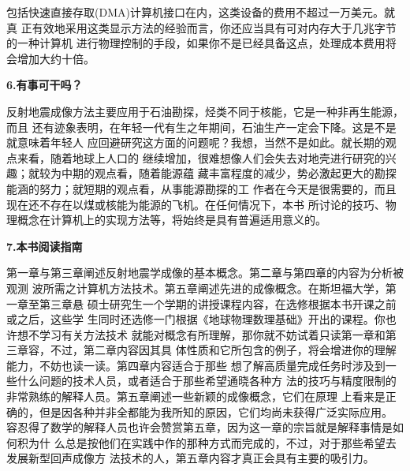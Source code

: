 包括快速直接存取(DMA)计算机接口在内，这类设备的费用不超过一万美元。就真
正有效地采用这类显示方法的经验而言，你还应当具有可对内存大于几兆字节的一种计算机
进行物理控制的手段，如果你不是已经具备这点，处理成本费用将会增加大约十倍。


\textbf{6.有事可干吗？}


反射地震成像方法主要应用于石油勘探，烃类不同于核能，它是一种非再生能源，而且
还有迹象表明，在年轻一代有生之年期间，石油生产一定会下降。这是不是就意味着年轻人
应回避研究这方面的问题呢？我想，当然不是如此。就长期的观点来看，随着地球上人口的
继续增加，很难想像人们会失去对地壳进行研究的兴趣；就较为中期的观点看，随着能源蕴
藏丰富程度的减少，势必激起更大的勘探能涵的努力；就短期的观点看，从事能源勘探的工
作者在今天是很需要的，而且现在还不存在以煤或核能为能源的飞机。在任何情况下，本书
所讨论的技巧、物理概念在计算机上的实现方法等，将始终是具有普遍适用意义的。


\textbf{7.本书阅读指南}


第一章与第三章阐述反射地震学成像的基本概念。第二章与第四章的内容为分析被观测
波所需之计算机方法技术。第五章阐述先进的成像概念。在斯坦福大学，第一章至第三章悬
硕士研究生一个学期的讲授课程内容，在选修根据本书开课之前或之后，这些学
生同时还选修一门根据《地球物理数理基础》开出的课程。你也许想不学习有关方法技术
就能对概念有所理解，那你就不妨试着只读第一章和第三章容，不过，第二章内容因其具
体性质和它所包含的例子，将会增进你的理解能力，不妨也读一读。第四章内容适合于那些
想了解高质量完成任务时涉及到一些什么问题的技术人员，或者适合于那些希望通晓各种方
法的技巧与精度限制的非常熟练的解释人员。第五章阐述一些新颖的成像概念，它们在原理
上看来是正确的，但是因各种并非全都能为我所知的原因，它们均尚未获得广泛实际应用。
容忍得了数学的解释人员也许会赞赏第五章，因为这一章的宗旨就是解释事情是如何积为什
么总是按他们在实践中作的那种方式而完成的，不过，对于那些希望去发展新型回声成像方
法技术的人，第五章内容才真正会具有主要的吸引力。

